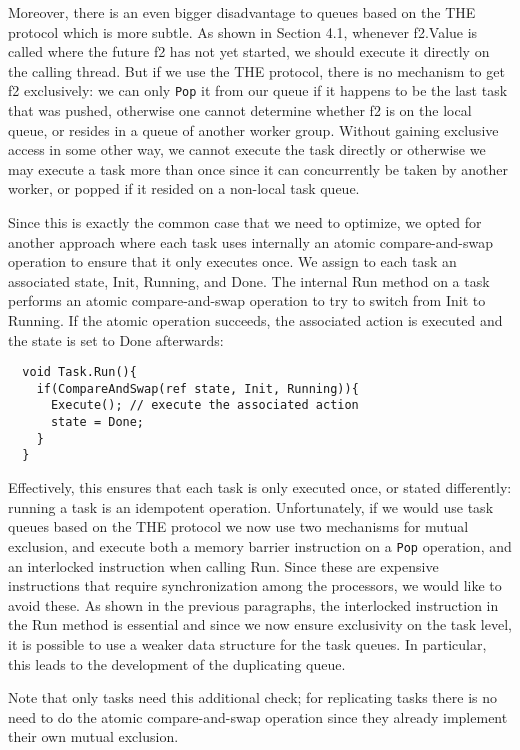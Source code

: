 Moreover, there is an even bigger disadvantage to queues based on the
THE protocol which is more subtle. As shown in Section 4.1, whenever
f2.Value is called where the future f2 has not yet started, we should
execute it directly on the calling thread. But if we use the THE
protocol, there is no mechanism to get f2 exclusively: we can only
\lstinline!Pop! it from our queue if it happens to be the last task
that was pushed, otherwise one cannot determine whether f2 is on the
local queue, or resides in a queue of another worker group. Without
gaining exclusive access in some other way, we cannot execute the task
directly or otherwise we may execute a task more than once since it
can concurrently be taken by another worker, or popped if it resided
on a non-local task queue.

Since this is exactly the common case that we need to optimize, we
opted for another approach where each task uses internally an atomic
compare-and-swap operation to ensure that it only executes once. We
assign to each task an associated state, Init, Running, and Done. The
internal Run method on a task performs an atomic compare-and-swap
operation to try to switch from Init to Running. If the atomic
operation succeeds, the associated action is executed and the state is
set to Done afterwards:

\begin{lstlisting}
  void Task.Run(){
    if(CompareAndSwap(ref state, Init, Running)){
      Execute(); // execute the associated action
      state = Done;
    }
  }
\end{lstlisting}

Effectively, this ensures that each task is only executed once, or
stated differently: running a task is an idempotent
operation. Unfortunately, if we would use task queues based on the THE
protocol we now use two mechanisms for mutual exclusion, and execute
both a memory barrier instruction on a \lstinline!Pop! operation, and
an interlocked instruction when calling Run. Since these are expensive
instructions that require synchronization among the processors, we
would like to avoid these. As shown in the previous paragraphs, the
interlocked instruction in the Run method is essential and since we
now ensure exclusivity on the task level, it is possible to use a
weaker data structure for the task queues. In particular, this leads
to the development of the duplicating queue.

Note that only tasks need this additional check; for replicating tasks
there is no need to do the atomic compare-and-swap operation since
they already implement their own mutual exclusion.

